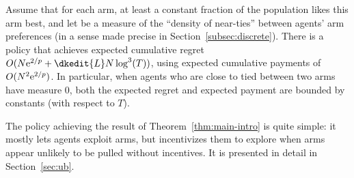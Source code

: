 


\begin{theorem} \label{thm:main-intro}
Assume that for each arm, at least a constant fraction \MinProb
of the population likes this arm best,
and let \TieDensity be a measure of the ``density of near-ties''
between agents' arm preferences
(in a sense made precise in Section~\ref{subsec:discrete}).
There is a policy that achieves expected 
cumulative regret $O (\ARMNUM \e^{2/\MinProb} + \dkedit{\TieDensity} \ARMNUM \log^3(T))$,
using expected cumulative payments of $O(N^2 \mathrm{e}^{2/p})$.
In particular, when agents who are close to tied between two arms have measure $0$,
both the expected regret and expected payment are bounded by constants
(with respect to $T$). 
\end{theorem}


The policy achieving the result of Theorem~\ref{thm:main-intro} is
quite simple: it mostly lets agents exploit arms, but incentivizes
them to explore when arms appear unlikely to be pulled without incentives.
It is presented in detail in Section~\ref{sec:ub}.
